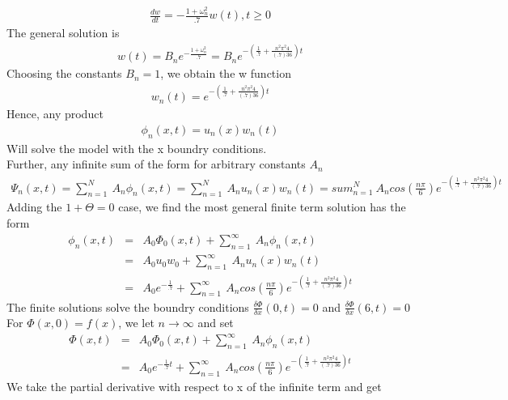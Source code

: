 \documentclass[11pt]{SelfArxOneColBMN}
\begin{document}
\begin{exercise}
\begin{solution}
   \begin{eqnarray*}
    \frac{dw}{dt} = - \frac{1 + \omega_n^2}{.7}w(t), t \geq 0
   \end{eqnarray*}
   The general solution is
   \begin{eqnarray*}
    w(t) = B_ne^{-\frac{1 + \omega^2_n}{.7}} = B_ne^{-(\frac{1}{.7} + \frac{n^2 \pi^2 4}{(.7)36})t}
   \end{eqnarray*}
   Choosing the constants $B_n = 1$, we obtain the w function\\
   \begin{eqnarray*}
    w_n(t) = e^{-(\frac{1}{.7} + \frac{n^2 \pi^2 4}{(.7)36})t}
   \end{eqnarray*}
   Hence, any product
   \begin{eqnarray*}
    \phi_n(x,t) = u_n(x)w_n(t)
   \end{eqnarray*}
   Will solve the model with the x boundry conditions.\\
   Further, any infinite sum of the form for arbitrary constants $A_n$
   \begin{eqnarray*}
    \Psi_n(x,t) = \sum_{n=1}^N\: A_n\phi_n(x,t) = \sum_{n=1}^N\: A_nu_n(x)w_n(t) = sum_{n=1}^N\: A_ncos(\frac{n\pi}{6})e^{-(\frac{1}{.7} + \frac{n^2 \pi^2 4}{(.7)36})t}
   \end{eqnarray*}
   Adding the $1 + \Theta = 0$ case, we find the most general finite term solution has the form
   \begin{eqnarray*}
    \phi_n(x,t) &=& A_0\Phi_0(x,t) + \sum_{n=1}^\infty\: A_n\phi_n(x,t)\\
    &=& A_0u_0w_0 + \sum_{n=1}^\infty\: A_nu_n(x)w_n(t)\\
    &=& A_0e^{-\frac{1}{.7}} + \sum_{n=1}^\infty\: A_ncos(\frac{n\pi}{6})e^{-(\frac{1}{.7} + \frac{n^2 \pi^2 4}{(.7)36})t} 
   \end{eqnarray*}
   The finite solutions solve the boundry conditions $\frac{\delta \Phi}{\delta x}(0,t) = 0$ and $\frac{\delta \Phi}{\delta x}(6,t) = 0$\\
   For $\Phi(x,0) = f(x)$, we let $n \rightarrow \infty$ and set
   \begin{eqnarray*}
    \Phi(x,t) &=& A_0\Phi_0(x,t) + \sum_{n=1}^\infty\: A_n\phi_n(x,t)\\
    &=& A_0e^{-\frac{1}{.7}t} + \sum_{n=1}^\infty\: A_ncos(\frac{n\pi}{6})e^{-(\frac{1}{.7} + \frac{n^2 \pi^2 4}{(.7)36})t} 
   \end{eqnarray*}
   We take the partial derivative with respect to x of the infinite term and get
   \begin{eqnarray*}

\end{eqnarray*}
\end{solution}
\end{exercise}
\end{document}
